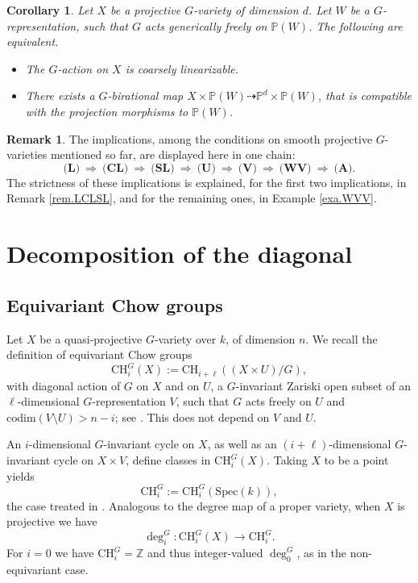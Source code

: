 \documentclass[12pt, reqno]{amsart}
\numberwithin{equation}{section}
\theoremstyle{plain}
\newtheorem{coro}[prop]{Corollary}
\theoremstyle{definition}
\newtheorem{rema}[prop]{Remark}
\def\bP{{\mathbb P}}
\def\bZ{{\mathbb Z}}
\def\codim{\mathrm{codim}}
\def\CH{\mathrm{CH}}
\def\Spec{\mathrm{Spec}}
\begin{document}
\begin{coro}
\label{cor.CL}
Let $X$ be a projective $G$-variety of dimension $d$.
Let $W$ be a $G$-representation, such that $G$ acts generically freely on $\bP(W)$.
The following are equivalent.
\begin{itemize}
\item[(i)] The $G$-action on $X$ is coarsely linearizable.
\item[(ii)] There exists a $G$-birational map $X\times \bP(W)\dashrightarrow \bP^d\times \bP(W)$, that is compatible with the projection morphisms to $\bP(W)$.
\end{itemize}
\end{coro}

\begin{rema}
\label{rem.manyconditions}
The implications, among the conditions on smooth projective $G$-varieties mentioned so far, are displayed here in one chain:
\[ \textbf{(L)}\ \Rightarrow\ 
\textbf{(CL)}\ \Rightarrow\ 
\textbf{(SL)}\ \Rightarrow\ \textbf{(U)}\ \Rightarrow\ \textbf{(V)}\ \Rightarrow\ \textbf{(WV)}\ \Rightarrow\ \textbf{(A)}. \]
The strictness of these implications is explained, for the first two implications, in Remark \ref{rem.LCLSL}, and
for the remaining ones, in Example \ref{exa.WVV}.
\end{rema}


\section{Decomposition of the diagonal}
\label{sect:obstr}


\subsection*{Equivariant Chow groups}
Let $X$ be a quasi-projective $G$-variety over $k$, of dimension $n$. We recall the definition of 
equivariant Chow groups
\[
\CH_i^G(X) := \CH_{i + \ell}((X\times U)/G),
\]
with diagonal action of $G$ on $X$ and on
$U$, a $G$-invariant Zariski open subset of an
$\ell$-dimensional $G$-representation $V$, such that $G$ acts freely on $U$ and $\codim(V \setminus U)>n-i$; see \cite{EG98}. 
This does not depend on $V$ and $U$. 

An $i$-dimensional $G$-invariant cycle on $X$, as well as 
an $(i + \ell)$-dimensional $G$-invariant cycle on $X \times V$, define classes 
in $\CH_i^G(X)$.
Taking $X$ to be a point yields
\[ \mathrm{CH}^G_i:=\mathrm{CH}^G_i(\Spec(k)), \]
the case treated in \cite{totaro}.
Analogous to the degree map of a proper variety, when $X$ is projective we have
\[ \deg_i^G\colon \CH_i^G(X)\to \CH_i^G. \]
For $i=0$ we have $\CH_i^G=\bZ$ and thus integer-valued $\deg_0^G$, as in the non-equivariant case.
\end{document}
